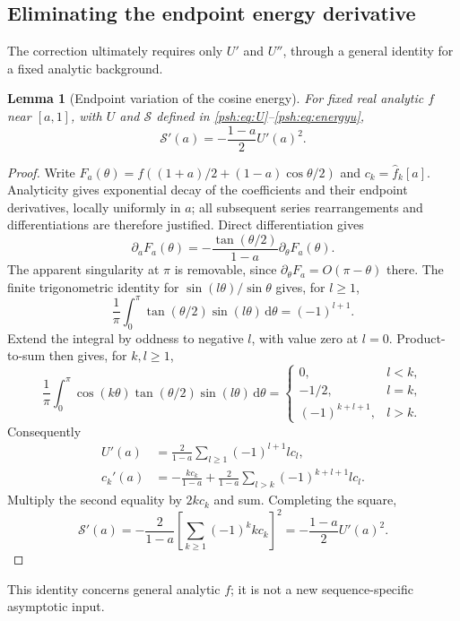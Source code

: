 \documentclass[11pt,a4paper]{article}
\numberwithin{equation}{section}
\newtheorem{lemma}[theorem]{Lemma}
\theoremstyle{remark}\newtheorem{remark}[theorem]{Remark}
\newcommand{\dd}{\,\mathrm d}
\newcommand{\fh}{\widehat f}
\begin{document}
\subsection{Eliminating the endpoint energy derivative}
The correction ultimately requires only $U'$ and $U''$, through a general
identity for a fixed analytic background.
\begin{lemma}[Endpoint variation of the cosine energy]\label{psh:lem:energy}
For fixed real analytic $f$ near $[a,1]$, with $U$ and $\mathcal S$
defined in \eqref{psh:eq:U}--\eqref{psh:eq:energyu},
\begin{equation}\label{psh:eq:energyderivative}
 \mathcal S'(a)=-\frac{1-a}{2}U'(a)^2.
\end{equation}
\end{lemma}
\begin{proof}
Write $F_a(\theta)=f((1+a)/2+(1-a)\cos\theta/2)$ and
$c_k=\fh_k[a]$. Analyticity gives exponential decay of the coefficients
and their endpoint derivatives, locally uniformly in $a$; all subsequent
series rearrangements and differentiations are therefore justified.
Direct differentiation gives
\[
 \partial_aF_a(\theta)=-\frac{\tan(\theta/2)}{1-a}
                           \partial_\theta F_a(\theta).
\]
The apparent singularity at $\pi$ is removable, since
$\partial_\theta F_a=O(\pi-\theta)$ there.
The finite trigonometric identity for
$\sin(l\theta)/\sin\theta$ gives, for $l\geq1$,
\[
 \frac1\pi\int_0^\pi\tan(\theta/2)\sin(l\theta)\dd\theta=(-1)^{l+1}.
\]
Extend the integral by oddness to negative $l$, with value zero at
$l=0$. Product-to-sum then gives, for $k,l\geq1$,
\[
 \frac1\pi\int_0^\pi\cos(k\theta)\tan(\theta/2)\sin(l\theta)\dd\theta
 =\begin{cases}0,&l<k,\\-1/2,&l=k,\\(-1)^{k+l+1},&l>k.\end{cases}
\]
Consequently
\begin{align*}
 U'(a)&=\frac2{1-a}\sum_{l\geq1}(-1)^{l+1}l c_l,\\
 c_k'(a)&=-\frac{k c_k}{1-a}
    +\frac2{1-a}\sum_{l>k}(-1)^{k+l+1}l c_l.
\end{align*}
Multiply the second equality by $2kc_k$ and sum. Completing the square,
\[
 \mathcal S'(a)=-\frac2{1-a}
       \left[\sum_{k\geq1}(-1)^k k c_k\right]^2
       =-\frac{1-a}{2}U'(a)^2.
\]
\end{proof}
This identity concerns general analytic $f$; it is not a new
sequence-specific asymptotic input.
\end{document}
